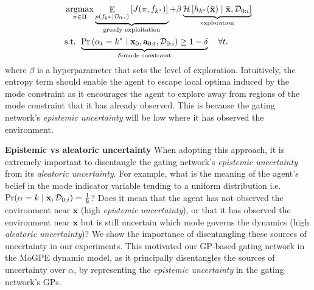 \documentclass[twoside]{article}
\DeclareMathOperator{\E}{\mathbb{E}}
\newcommand{\modeInd}{\ensuremath{k}}
\newcommand{\ModeInd}{\ensuremath{\MakeUppercase{\modeInd}}}
\newcommand{\state}{\ensuremath{\mathbf{x}}}
\newcommand{\dataset}{\ensuremath{\mathcal{D}}}
\newcommand{\modeVar}{\ensuremath{\alpha}}
\DeclareMathOperator*{\argmax}{argmax}
\begin{document}
\begin{subequations} \label{eq-joint-entropy-objective}
\begin{align}
&\argmax_{\pi \in \Pi}
\underbrace{\E_{p(\dynamicsFunc_{\desiredMode} \mid \dataset_{0:i})} \left[ J(\pi, \dynamicsFunc_{\desiredMode}) \right]}_{\text{greedy exploitation}} +
\beta\underbrace{\mathcal{H} \left[
\desiredGatingFunction(\stateTraj) \mid \stateTraj, \dataset_{0:i} \right]}_{\text{exploration}} \\
&\text{s.t. } \underbrace{ \Pr \left(\modeVar_{\timeInd} = \desiredMode \mid \state_{0}, \action_{0:\timeInd}, \mathcal{D}_{0:i} \right)
\geq 1-\delta}_{\delta\text{-mode constraint}} \quad \forall \timeInd.
\end{align}
\end{subequations}
where \(\beta\) is a hyperparameter that sets the level of exploration.
Intuitively, the entropy term should enable the agent to escape local optima induced by the mode constraint as it
encourages the agent to explore away from regions of the mode constraint that it has already observed.
This is because the gating network's \emph{epistemic uncertainty} will be low where it has observed the environment.

\textbf{Epistemic vs aleatoric uncertainty}
When adopting this approach, it is extremely important to disentangle the gating network's \emph{epistemic uncertainty} from its \emph{aleatoric uncertainty}.
For example, what is the meaning of the agent's belief in the mode indicator variable
tending to a uniform distribution i.e. \(\Pr(\modeVar=\modeInd \mid \state, \dataset_{0:i})=\frac{1}{\ModeInd}\)?
Does it mean that the agent has not observed the environment near \(\state\) (high \emph{epistemic uncertainty}), or
that it has observed the environment near \(\state\) but is still uncertain which mode governs the dynamics (high \emph{aleatoric uncertainty})?
We show the importance of disentangling these sources of uncertainty in our experiments.
This motivated our GP-based gating network in the MoGPE dynamic model, as it principally
disentangles the sources of uncertainty over \(\alpha\), by representing the \emph{epistemic uncertainty} in the gating network's GPs.
\end{document}
